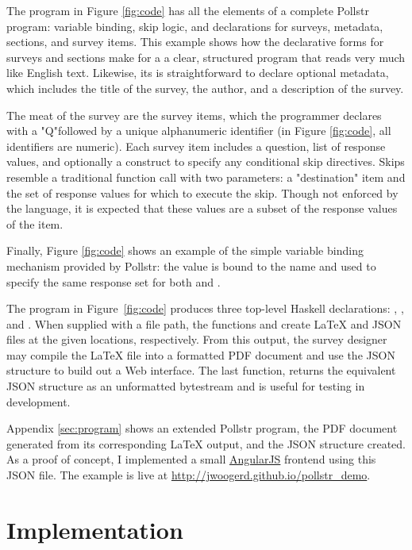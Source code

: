 \documentclass[pldi]{sigplanconf-pldi15}
\begin{document}
The program in Figure \ref{fig:code} has all the elements of a complete Pollstr program: variable
binding, skip logic, and declarations for surveys, metadata, sections, 
and survey items. This example shows how the declarative forms for surveys and 
sections make for a a clear, structured program that reads very much like English 
text. Likewise, its is straightforward to declare optional metadata, which 
includes the title of the survey, the author, and a description of the survey.

The meat of the survey are the survey items, which the programmer declares 
with a "Q"followed by a unique alphanumeric identifier (in Figure \ref{fig:code}, all 
identifiers are numeric). Each survey item includes a question, list of 
response values, and optionally a  construct to specify any 
conditional skip directives. Skips resemble a traditional function call with
two parameters: a "destination" item and the set of response values 
for which to execute the skip. Though not enforced by the language, it is 
expected that these values are a subset of the response values of the item.

Finally, Figure \ref{fig:code} shows an example of the simple variable binding mechanism 
provided by Pollstr: the value  is bound to the name 
 and used to specify the same response set for both  
and .

The program in Figure~\ref{fig:code} produces three top-level Haskell 
declarations: , , and .
When supplied with a file path, the functions  and 
 create LaTeX and JSON files at the given locations, respectively. 
From this output, the survey designer may compile the LaTeX file into a formatted PDF 
document and use the JSON structure to build out a Web interface. The last 
function,  returns the equivalent JSON structure as 
an unformatted bytestream and is useful for testing in development.

Appendix \ref{sec:program} shows an extended Pollstr program, the PDF document generated
from its corresponding LaTeX output, and the JSON structure created. As a proof
of concept, I implemented a small \href{https://angularjs.org/}{AngularJS} 
frontend using this JSON file.
The example is live at \url{http://jwoogerd.github.io/pollstr_demo}.

\section{Implementation}\label{sec:implemenation}
\end{document}

